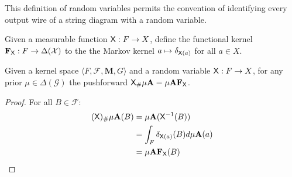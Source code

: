This definition of random variables permits the convention of identifying every output wire of a string diagram with a random variable. 

\begin{definition}
Given a measurable function $\mathsf{X}:F\to X$, define the functional kernel $\mathbf{F}_{\mathsf{X}}:F\to \Delta(\mathcal{X})$ to the the Markov kernel $a\mapsto \delta_{\mathsf{X}(a)}$ for all $a\in X$.
\end{definition}

\begin{lemma}\label{lem:pushf_funk}
Given a kernel space $\langle F,\mathcal{F},\mathbf{M}, G\rangle$ and a random variable $\mathsf{X}:F\to X$, for any prior $\mu\in \Delta(\mathcal{G})$ the pushforward $\mathsf{X}_\# \mu \mathbf{A} = \mu\mathbf{A} \mathbf{F}_{\mathsf{X}}$.
\end{lemma}

\begin{proof}
For all $B\in \mathcal{F}$:
\begin{align}
  (\mathsf{X})_\# \mu \mathbf{A} (B) &= \mu \mathbf{A} (\mathsf{X}^{-1}(B))\\
  								   &= \int_{F} \delta_{\mathsf{X}(a)} (B) d\mu\mathbf{A} (a)\\
  								   &= \mu\mathbf{A}\mathbf{F}_{\mathsf{X}}(B)
\end{align}
\end{proof}

